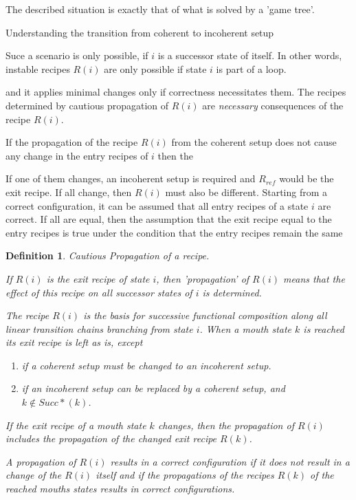 \documentclass[12pt,a4paper]{scrartcl}
\newtheorem{definition}{Definition}
\begin{document}
The described situation is exactly that of what is solved by a 'game tree'.


Understanding the transition from coherent to incoherent setup 


Suce a scenario is only possible, if $i$ is a
successor state of itself. In other words, instable recipes $R(i)$ are only
possible if state $i$ is part of a loop. 


and it applies minimal changes only if correctness necessitates them.
The recipes determined by cautious propagation of $R(i)$ are \textit{necessary}
consequences of the recipe $R(i)$.

If the propagation of the recipe $R(i)$ from the coherent setup does not cause
any change in the entry recipes of $i$ then the 




If one of them changes, an
incoherent setup is required and $R_{ref}$ would be the exit recipe. If all
change, then $R(i)$ must also be different. Starting from a correct
configuration, it can be assumed that all entry recipes of a state $i$ are
correct. If all are equal, then the assumption that the exit recipe equal
to the entry recipes is true under the condition that the entry recipes
remain the same

\begin{definition} Cautious Propagation of a recipe.
    
    If $R(i)$ is the exit recipe of state $i$, then 'propagation' of $R(i)$
    means that the effect of this recipe on all successor states of $i$ is 
    determined.

    The recipe $R(i)$ is the basis for successive functional composition along
    all linear transition chains branching from state $i$. When a mouth state
    $k$ is reached its exit recipe is left as is, except 
    \begin{enumerate}
       \item if a coherent setup must be changed to an incoherent setup.
       \item if an incoherent setup can be replaced by a coherent setup, 
             and $k\notin Succ*(k)$.
    \end{enumerate}
    
    If the exit recipe of a  mouth state $k$ changes, then the propagation of
    $R(i)$ includes the propagation of the changed exit recipe $R(k)$.

    A propagation of $R(i)$ results in a correct configuration if it does not
    result in a change of the $R(i)$ itself and if the propagations of the
    recipes $R(k)$ of the reached mouths states results in correct
    configurations.
    
\end{definition}
\end{document}
